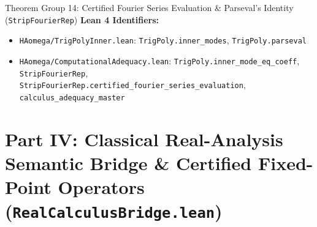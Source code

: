 \documentclass[11pt,a4paper]{article}
\newcommand{\lean}[1]{\texttt{\nolinkurl{#1}}}
\begin{document}
\begin{thmcard}{Theorem Group 14: Certified Fourier Series Evaluation \& Parseval's Identity (\lean{StripFourierRep})}
\textbf{Lean 4 Identifiers:}
\begin{itemize}
  \item \lean{HAomega/TrigPolyInner.lean}: \lean{TrigPoly.inner_modes}, \lean{TrigPoly.parseval}
  \item \lean{HAomega/ComputationalAdequacy.lean}: \lean{TrigPoly.inner_mode_eq_coeff}, \lean{StripFourierRep}, \lean{StripFourierRep.certified_fourier_series_evaluation}, \lean{calculus_adequacy_master}
\end{itemize}
\end{thmcard}

\newpage
\section{Part IV: Classical Real-Analysis Semantic Bridge \& Certified Fixed-Point Operators (\texorpdfstring{\lean{RealCalculusBridge.lean}}{RealCalculusBridge.lean})}
\end{document}
